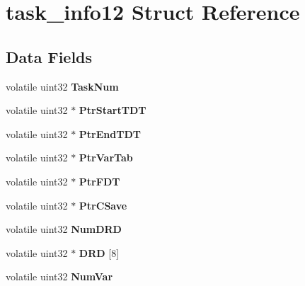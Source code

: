 \hypertarget{structtask__info12}{}\section{task\+\_\+info12 Struct Reference}
\label{structtask__info12}
\subsection*{Data Fields}
\begin{DoxyCompactItemize}
\item 
\mbox{\label{structtask__info12_a3d860e64855c35d07385d3206f9d35c5}} 
volatile uint32 {\bfseries Task\+Num}
\item 
\mbox{\label{structtask__info12_ab263f3fd6c53ac9a9b0690e5ad781db6}} 
volatile uint32 $\ast$ {\bfseries Ptr\+Start\+T\+DT}
\item 
\mbox{\label{structtask__info12_a4a7f040e85ed6a785cd0f852eae2cd43}} 
volatile uint32 $\ast$ {\bfseries Ptr\+End\+T\+DT}
\item 
\mbox{\label{structtask__info12_a3b16b8500203f73f100afb67612aabe9}} 
volatile uint32 $\ast$ {\bfseries Ptr\+Var\+Tab}
\item 
\mbox{\label{structtask__info12_ad3b24803be7b4b09ee6dd37d82567a8e}} 
volatile uint32 $\ast$ {\bfseries Ptr\+F\+DT}
\item 
\mbox{\label{structtask__info12_a095b86e72b22125e09995e38cbf9a742}} 
volatile uint32 $\ast$ {\bfseries Ptr\+C\+Save}
\item 
\mbox{\label{structtask__info12_a6da4477c71c37fe830101bf001c6f781}} 
volatile uint32 {\bfseries Num\+D\+RD}
\item 
\mbox{\label{structtask__info12_ae54c738cdd6ca608a0a941f172ca0493}} 
volatile uint32 $\ast$ {\bfseries D\+RD} \mbox{[}8\mbox{]}
\item 
\mbox{\label{structtask__info12_a47a77aecdcfe5cc6582232103f30762f}} 
volatile uint32 {\bfseries Num\+Var}

\end{DoxyCompactItemize}
